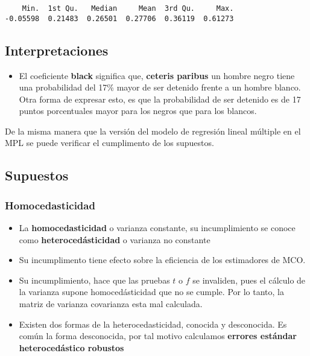 \documentclass[
  letterpaper,
  DIV=11,
  numbers=noendperiod]{scrreprt}
\newenvironment{Shaded}{\begin{snugshade}}{\end{snugshade}}
\newcommand{\CommentTok}[1]{\textcolor[rgb]{0.37,0.37,0.37}{#1}}
\newcommand{\FunctionTok}[1]{\textcolor[rgb]{0.28,0.35,0.67}{#1}}
\newcommand{\NormalTok}[1]{\textcolor[rgb]{0.00,0.23,0.31}{#1}}
\newcommand{\SpecialCharTok}[1]{\textcolor[rgb]{0.37,0.37,0.37}{#1}}
\providecommand{\tightlist}{%
  \setlength{\itemsep}{0pt}\setlength{\parskip}{0pt}}\usepackage{longtable,booktabs,array}
\begin{document}
\begin{Shaded}
\end{Shaded}

\begin{verbatim}
    Min.  1st Qu.   Median     Mean  3rd Qu.     Max. 
-0.05598  0.21483  0.26501  0.27706  0.36119  0.61273 
\end{verbatim}

\subsection{Interpretaciones}\label{interpretaciones-1}

\begin{itemize}
\tightlist
\item
  El coeficiente \textbf{black} significa que, \textbf{ceteris paribus}
  un hombre negro tiene una probabilidad del 17\% mayor de ser detenido
  frente a un hombre blanco. Otra forma de expresar esto, es que la
  probabilidad de ser detenido es de 17 puntos porcentuales mayor para
  los negros que para los blancos.
\end{itemize}

De la misma manera que la versión del modelo de regresión lineal
múltiple en el MPL se puede verificar el cumplimento de los supuestos.

\subsection{Supuestos}\label{supuestos}

\subsubsection{Homocedasticidad}\label{homocedasticidad}

\begin{itemize}
\item
  La \textbf{homocedasticidad} o varianza constante, su incumplimiento
  se conoce como \textbf{heterocedásticidad} o varianza no constante
\item
  Su incumplimento tiene efecto sobre la eficiencia de los estimadores
  de MCO.
\item
  Su incumplimiento, hace que las pruebas \(t\) o \(f\) se invaliden,
  pues el cálculo de la varianza supone homocedásticidad que no se
  cumple. Por lo tanto, la matriz de varianza covarianza esta mal
  calculada.
\item
  Existen dos formas de la heterocedasticidad, conocida y desconocida.
  Es común la forma desconocida, por tal motivo calculamos
  \textbf{errores estándar heterocedástico robustos}
\end{itemize}
\end{document}
